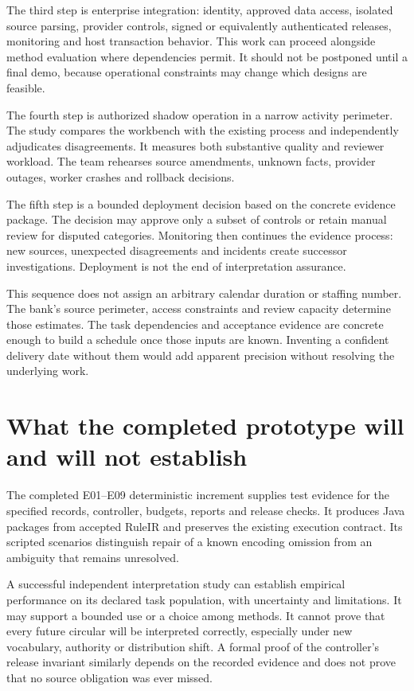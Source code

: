 The third step is enterprise integration: identity, approved data access, isolated
source parsing, provider controls, signed or equivalently authenticated releases,
monitoring and host transaction behavior. This work can proceed alongside method
evaluation where dependencies permit. It should not be postponed until a final
demo, because operational constraints may change which designs are feasible.


The fourth step is authorized shadow operation in a narrow activity perimeter.
The study compares the workbench with the existing process and independently
adjudicates disagreements. It measures both substantive quality and reviewer
workload. The team rehearses source amendments, unknown facts, provider outages,
worker crashes and rollback decisions.

The fifth step is a bounded deployment decision based on the concrete evidence
package. The decision may approve only a subset of controls or retain manual
review for disputed categories. Monitoring then continues the evidence process:
new sources, unexpected disagreements and incidents create successor
investigations. Deployment is not the end of interpretation assurance.

This sequence does not assign an arbitrary calendar duration or staffing number.
The bank's source perimeter, access constraints and review capacity determine
those estimates. The task dependencies and acceptance evidence are concrete enough
to build a schedule once those inputs are known. Inventing a confident delivery
date without them would add apparent precision without resolving the underlying
work.

\section{What the completed prototype will and will not establish}
\label{merge:M10:15}


The completed E01--E09 deterministic increment supplies test evidence for
the specified records, controller, budgets, reports and release checks.
It produces Java packages from accepted RuleIR and preserves the existing
execution contract. Its scripted scenarios distinguish repair of a known
encoding omission from an ambiguity that remains unresolved.

A successful independent interpretation study can establish empirical performance
on its declared task population, with uncertainty and limitations. It may support
a bounded use or a choice among methods. It cannot prove that every future
circular will be interpreted correctly, especially under new vocabulary,
authority or distribution shift. A formal proof of the controller's release
invariant similarly depends on the recorded evidence and does not prove that no
source obligation was ever missed.

